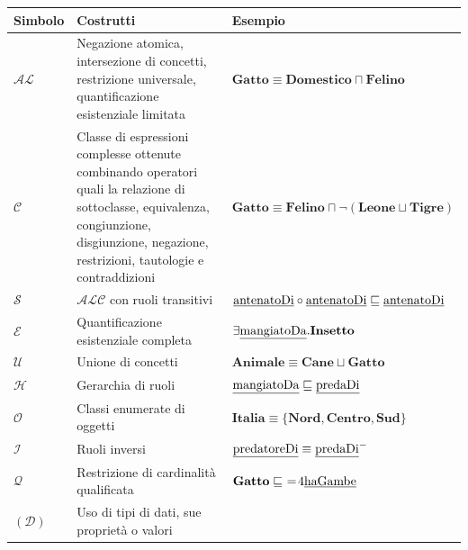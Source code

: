 \documentclass{article}
\begin{document}
\begin{table}[h!t] 
    \centering
    \caption{Alcuni simboli di DL con associati i costrutti caratteristici.}
    \label{tab:fragments_DL}
    \begin{longtable}{p{}p{}p{}}
        \textbf{Simbolo} & \textbf{Costrutti} & \textbf{Esempio}  \\
        \hline
        $\mathcal{AL}$ & 
        Negazione atomica, intersezione di concetti, restrizione universale, quantificazione esistenziale limitata & 
        $ \textbf{Gatto} \equiv \textbf{Domestico} \sqcap \textbf{Felino} $ \\
        \hline
        $\mathcal{C}$ & 
        Classe di espressioni complesse ottenute combinando operatori quali la relazione di sottoclasse, equivalenza, congiunzione, disgiunzione, negazione, restrizioni, tautologie e contraddizioni & 
        $ \textbf{Gatto} \equiv \textbf{Felino} \sqcap \neg (\textbf{Leone} \sqcup \textbf{Tigre}) $ \\
        \hline
        $\mathcal{S}$ & $ \mathcal{ALC} $ con ruoli transitivi &
        $ \textrm{\underline{antenatoDi}} \circ \textrm{\underline{antenatoDi}} \sqsubseteq \textrm{\underline{antenatoDi}} $ \\
        \hline
        $\mathcal{E}$ & Quantificazione esistenziale completa & 
        $ \exists \textrm{\underline{mangiatoDa}}.\textbf{Insetto} $ \\
        \hline
        $\mathcal{U}$ & Unione di concetti & $ \textbf{Animale} \equiv \textbf{Cane} \sqcup \textbf{Gatto} $ \\
        \hline
        $\mathcal{H}$ & Gerarchia di ruoli & $ \textrm{\underline{mangiatoDa}} \sqsubseteq \textrm{\underline{predaDi}} $ \\
        \hline
        $\mathcal{O}$ & Classi enumerate di oggetti & $ \textbf{Italia} \equiv \{ \textbf{Nord}, \textbf{Centro}, \textbf{Sud} \} $ \\
        \hline
        $\mathcal{I}$ & Ruoli inversi & $ \textrm{\underline{predatoreDi}} \equiv \textrm{\underline{predaDi}}^{-} $ \\
        \hline
        $\mathcal{Q}$ & Restrizione di cardinalità qualificata & $ \textbf{Gatto} \sqsubseteq  \ = \! 4\textrm{\underline{haGambe}} $ \\
        \hline
        $\mathcal{(D)}$ & Uso di tipi di dati, sue proprietà o valori &  \\
        \hline
    \end{longtable}
\end{table}
\end{document}

